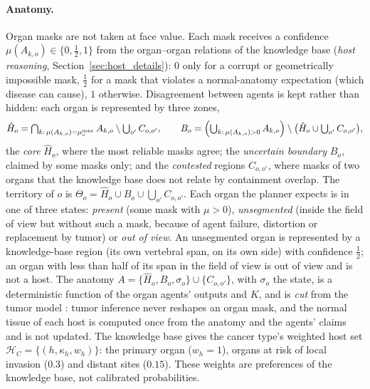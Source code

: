 \documentclass[fleqn,10pt]{olplainarticle}
\begin{document}
\paragraph{Anatomy.}
Organ masks are not taken at face value. Each mask receives a confidence $\mu(A_{k,o})\in\{0,\tfrac12,1\}$ from the
organ--organ relations of the knowledge base (\emph{host reasoning}, Section~\ref{sec:host_details}): $0$ only for a corrupt or geometrically
impossible mask, $\tfrac12$ for a mask that violates a normal-anatomy expectation (which disease can cause), $1$
otherwise. Disagreement between agents is kept rather than hidden: each organ is represented by three zones,
\begin{equation}
\label{eq:organ_reference}
\hat H_o=\textstyle\bigcap_{k:\,\mu(A_{k,o})=\mu^{\max}_o}A_{k,o}\setminus\bigcup_{o'}C_{o,o'},\qquad
B_o=\Bigl(\textstyle\bigcup_{k:\,\mu(A_{k,o})>0}A_{k,o}\Bigr)\setminus\bigl(\hat H_o\cup\textstyle\bigcup_{o'}C_{o,o'}\bigr),
\end{equation}
the \emph{core} $\hat H_o$, where the most reliable masks agree; the \emph{uncertain boundary} $B_o$, claimed by some
masks only; and the \emph{contested} regions $C_{o,o'}$, where masks of two organs that the knowledge base does not relate
by containment overlap. The territory of $o$ is $\Theta_o=\hat H_o\cup B_o\cup\bigcup_{o'}C_{o,o'}$. Each organ the
planner expects is in one of three states: \emph{present} (some mask with $\mu>0$), \emph{unsegmented} (inside the field
of view but without such a mask, because of agent failure, distortion or replacement by tumor) or \emph{out of view}. An
unsegmented organ is represented by a knowledge-base region (its own vertebral span, on its own side) with confidence
$\tfrac12$; an organ with less than half of its span in the field of view is out of view and is not a host. The anatomy $A=\{\hat H_o,B_o,\sigma_o\}\cup\{C_{o,o'}\}$, with $\sigma_o$ the
state, is a deterministic function of the organ agents' outputs and $K$, and is \emph{cut} from the tumor model
\cite{liu2009modularization,plummer2015cuts,jacob2017better}: tumor inference never reshapes an organ mask, and the normal
tissue of each host is computed once from the anatomy and the agents' claims and is not updated. The knowledge base
gives the cancer type's weighted host set $\mathcal{H}_C=\{(h,\kappa_h,w_h)\}$: the primary organ ($w_h=1$), organs at
risk of local invasion ($0.3$) and distant sites ($0.15$). These weights are preferences of the knowledge base, not
calibrated probabilities.
\end{document}
